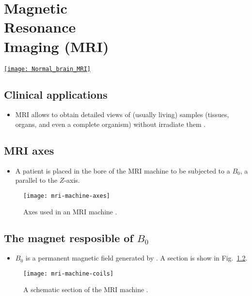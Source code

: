 \chapter[\glsentrylong{MRI} (\glsentryshort{MRI})]{Magnetic\\Resonance\\Imaging (MRI)}
\vspace{-50ex}
\begin{flushright}
\href{https://www.sciencephoto.com/media/728494/view/normal-brain-mri}{\texttt{[image: Normal\_brain\_MRI]}}
\end{flushright}

\section{Clinical applications}
\begin{itemize}
\item \gls{MRI}
  \cite{westbrook2018mri,Wu2022MRI_Physics,thePIRL2018NMR_basics,thePIRL2018SpinEcho,thePIRL2018Fourier,thePIRL2018GRE}
  allows to obtain detailed views of (usually living) samples
  (tissues, organs, and even a complete organism) without irradiate
  them \cite{wikipedia_MRI}.
\end{itemize}

\section{MRI axes}
\begin{itemize}
\item A patient is placed in the bore of the MRI machine to be
  subjected to a $B_0$, a  parallel to the $Z$-axis.
\end{itemize}
\vspace{-4ex}
\begin{figure}[!b]
  \centering
  \texttt{[image: mri-machine-axes]}
  \caption{Axes used in an MRI machine \cite{abdulla2025MRI_machine}.}
  \label{fig:MRI_axes}
\end{figure}

\section{The magnet resposible of $B_0$}
\begin{itemize}
\item $B_0$ is a permanent magnetic field generated by . A section is
  show in Fig.~\ref{fig:MRI_machine_scheme}.
\end{itemize}
\vspace{-4ex}
\begin{figure}[!b]
  \centering
  \texttt{[image: mri-machine-coils]}
  \caption{A schematic section of the MRI machine \cite{abdulla2025MRI_machine}.}
  \label{fig:MRI_machine_scheme}
\end{figure}

